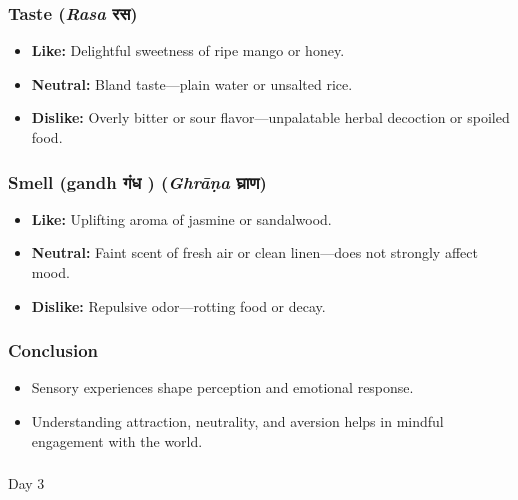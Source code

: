 \begin{frame}[fragile]\frametitle{Taste (\textit{Rasa} \textbf{रस})}
      \begin{itemize}
          \item \textbf{Like:} Delightful sweetness of ripe mango or honey.
          \item \textbf{Neutral:} Bland taste—plain water or unsalted rice.
          \item \textbf{Dislike:} Overly bitter or sour flavor—unpalatable herbal decoction or spoiled food.
      \end{itemize}
\end{frame}



\begin{frame}[fragile]\frametitle{Smell (gandh गंध ) (\textit{Ghrāṇa} \textbf{घ्राण})}
      \begin{itemize}
          \item \textbf{Like:} Uplifting aroma of jasmine or sandalwood.
          \item \textbf{Neutral:} Faint scent of fresh air or clean linen—does not strongly affect mood.
          \item \textbf{Dislike:} Repulsive odor—rotting food or decay.
      \end{itemize}
\end{frame}



\begin{frame}[fragile]\frametitle{Conclusion}
      \begin{itemize}
          \item Sensory experiences shape perception and emotional response.
          \item Understanding attraction, neutrality, and aversion helps in mindful engagement with the world.
      \end{itemize}
\end{frame}


\begin{frame}[fragile]\frametitle{}
\begin{center}
{\Large Day 3}
\end{center}
\end{frame}

